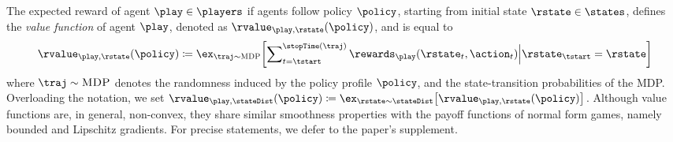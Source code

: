 The expected reward of agent $\play\in\players$ if agents follow policy $\policy$, starting from initial state $\rstate\in\states$, defines the \emph{value function} of agent $\play$, denoted as $\rvalue_{\play,\rstate}\parens{\policy}$, and is equal to
\begin{equation}
\rvalue_{\play,\rstate}\parens{\policy}
	\defeq\ex_{\traj \sim \MDP} \bracks*{\insum_{\time =\tstart}^{\stopTime\parens{\traj}} \rewards_{\play}\parens{\rstate_{\time},\action_\time} \Big\vert \rstate_\tstart = \rstate}
\end{equation}
where $\traj \sim \MDP$ denotes the randomness induced by the policy profile $\policy$, and the state-transition probabilities of the MDP. Overloading the notation, we set $  \rvalue_{\play,\stateDist}\parens{\policy}\defeq\ex_{\rstate\sim\stateDist}\bracks*{   \rvalue_{\play,\rstate}\parens{\policy}}$. 
Although value functions are, in general, non-convex, they share similar smoothness properties with the payoff functions of normal form games, namely bounded and Lipschitz gradients.
For precise statements, we defer to the paper's supplement.



